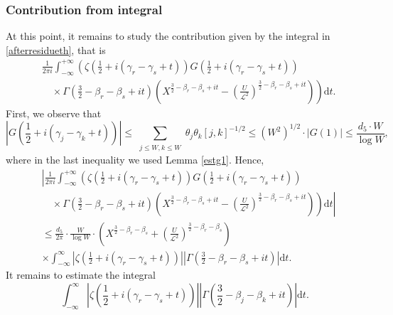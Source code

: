 \documentclass[reqno]{amsart}
\numberwithin{equation}{section}
\theoremstyle{remark}
\begin{document}
\subsubsection{Contribution from integral}
At this point, it remains to study the contribution given by the integral in \eqref{afterresidueth}, that is
\begin{equation*}
    \begin{aligned}
        &\frac{1}{2\pi i}\int_{-\infty}^{+\infty}\left(\zeta\left(\frac{1}{2}+i(\gamma_r-\gamma_s+t)\right)G\left(\frac{1}{2}+i(\gamma_r-\gamma_s+t)\right)\right.\\&\left.\quad\times\Gamma\left(\frac{3}{2}-\beta_r-\beta_s+it\right)\left(X^{\frac{3}{2}-\beta_r-\beta_s+it}-\left(\frac{U}{\mathcal{L}^2}\right)^{\frac{3}{2}-\beta_r-\beta_s+it}\right)\right)\text{d}t.
    \end{aligned}
\end{equation*}
First, we observe that \begin{equation*}
    \left|G\left(\frac{1}{2}+i(\gamma_j-\gamma_k+t)\right)\right| \le \sum_{\substack{j \leq W, k \leq W}} \theta_j \theta_k[j, k]^{-1/2}\le (W^2)^{1/2}\cdot |G(1)|\le  \frac{d_5\cdot W}{\log W},
\end{equation*}
where in the last inequality we used Lemma \ref{estg1}.
Hence,
\begin{equation}\label{remainderrhs}
    \begin{aligned}
       &\left|\frac{1}{2\pi i}\int_{-\infty}^{+\infty}\left(\zeta\left(\frac{1}{2}+i(\gamma_r-\gamma_s+t)\right)G\left(\frac{1}{2}+i(\gamma_r-\gamma_s+t)\right)\right.\right.\\&\left.\left.\quad\times \Gamma\left(\frac{3}{2}-\beta_r-\beta_s+it\right)\left(X^{\frac{3}{2}-\beta_r-\beta_s+it}-\left(\frac{U}{\mathcal{L}^2}\right)^{\frac{3}{2}-\beta_r-\beta_s+it}\right)\right)\text{d}t\right|\\&\le \frac{ d_5}{2\pi}\cdot \frac{W}{\log W}\cdot\left(X^{\frac{3}{2}-\beta_r-\beta_s}+\left(\frac{U}{\mathcal{L}^2}\right)^{\frac{3}{2}-\beta_r-\beta_s}\right)\\&\times \int_{-\infty}^{\infty}\left|\zeta\left(\frac{1}{2}+i(\gamma_r-\gamma_s+t)\right)\right|\left|\Gamma\left(\frac{3}{2}-\beta_r-\beta_s+it\right)\right|\text{d}t.
    \end{aligned}
\end{equation}
It remains to estimate the integral 
\begin{equation}\label{singleintegral}
    \int_{-\infty}^{\infty}\left|\zeta\left(\frac{1}{2}+i(\gamma_r-\gamma_s+t)\right)\right|\left|\Gamma\left(\frac{3}{2}-\beta_j-\beta_k+it\right)\right|\text{d}t.
\end{equation}
\end{document}
